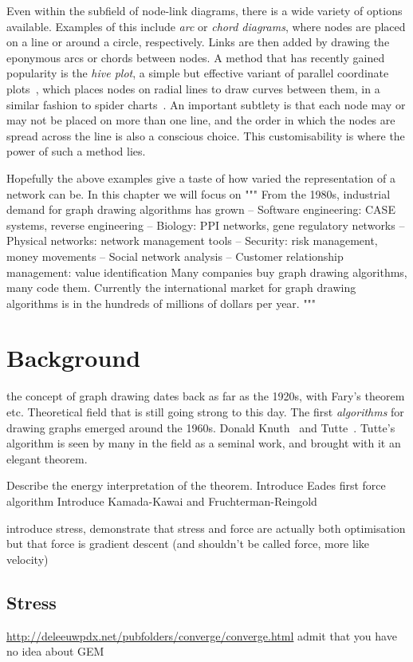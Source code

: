 Even within the subfield of node-link diagrams, there is a wide variety of options available.
Examples of this include \emph{arc} or \emph{chord diagrams}, where nodes are placed on a line or around a circle, respectively. Links are then added by drawing the eponymous arcs or chords between nodes.
A method that has recently gained popularity is the \emph{hive plot}, a simple but effective variant of parallel coordinate plots~\cite{TODO}, which places nodes on radial lines to draw curves between them, in a similar fashion to spider charts~\cite{TODO}. An important subtlety is that each node may or may not be placed on more than one line, and the order in which the nodes are spread across the line is also a conscious choice. This customisability is where the power of such a method lies.

Hopefully the above examples give a taste of how varied the representation of a network can be. In this chapter we will focus on 
"""
 From the 1980s, industrial demand for graph drawing algorithms has grown
– Software engineering: CASE systems, reverse engineering – Biology: PPI networks, gene regulatory networks
– Physical networks: network management tools
– Security: risk management, money movements
– Social network analysis
– Customer relationship management: value identification Many companies buy graph drawing algorithms, many code them.
Currently the international market for graph drawing algorithms is in the hundreds of millions of dollars per year.
"""

\section{Background}
the concept of graph drawing dates back as far as the 1920s, with Fary's theorem etc. Theoretical field that is still going strong to this day.
The first \emph{algorithms} for drawing graphs emerged around the 1960s. Donald Knuth~\cite{TODO} and Tutte~\cite{TODO}.
Tutte's algorithm is seen by many in the field as a seminal work, and brought with it an elegant theorem.

Describe the energy interpretation of the theorem.
Introduce Eades first force algorithm
Introduce Kamada-Kawai and Fruchterman-Reingold

introduce stress, demonstrate that stress and force are actually both optimisation but that force is gradient descent (and shouldn't be called force, more like velocity)
\subsection{Stress}
\url{http://deleeuwpdx.net/pubfolders/converge/converge.html}
admit that you have no idea about GEM 

